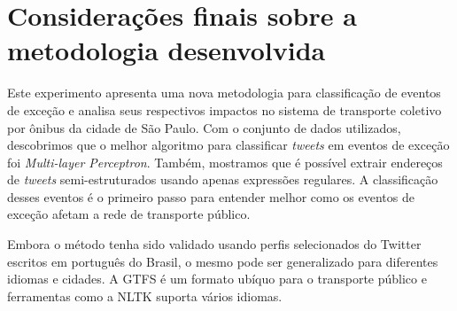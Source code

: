 \documentclass[
	12pt,				%
	oneside,			%
	a4paper,			%
	english,			%
	brazil				%
	]{abntex2ppgsi}
\begin{document}
\section{Considerações finais sobre a metodologia desenvolvida}

Este experimento apresenta uma nova metodologia para classificação de eventos de exceção e analisa seus respectivos impactos no sistema de transporte coletivo por ônibus da cidade de São Paulo. Com o conjunto de dados utilizados, descobrimos que o melhor algoritmo para classificar \textit{tweets} em eventos de exceção foi \textit{Multi-layer Perceptron}. Também, mostramos que é possível extrair endereços de \textit{tweets} semi-estruturados usando apenas expressões regulares. A classificação desses eventos é o primeiro passo para entender melhor como os eventos de exceção afetam a rede de transporte público.

Embora o método tenha sido validado usando perfis selecionados do Twitter escritos em português do Brasil, o mesmo pode ser generalizado para diferentes idiomas e cidades. A GTFS é um formato ubíquo para o transporte público e ferramentas como a NLTK suporta vários idiomas.



\end{document}
